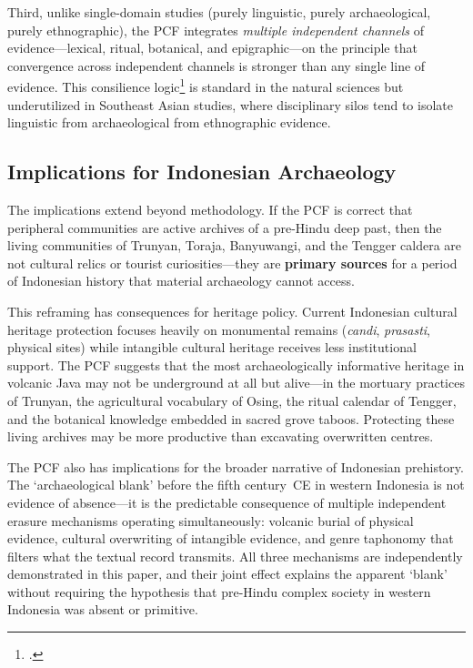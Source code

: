 \documentclass[12pt,a4paper]{article}
\begin{document}
Third, unlike single-domain studies (purely linguistic, purely archaeological, purely ethnographic), the PCF integrates \emph{multiple independent channels} of evidence---lexical, ritual, botanical, and epigraphic---on the principle that convergence across independent channels is stronger than any single line of evidence. This consilience logic\footnote{\autocite{whewell1840philosophy}.} is standard in the natural sciences but underutilized in Southeast Asian studies, where disciplinary silos tend to isolate linguistic from archaeological from ethnographic evidence.

\subsection{Implications for Indonesian Archaeology}

The implications extend beyond methodology. If the PCF is correct that peripheral communities are active archives of a pre-Hindu deep past, then the living communities of Trunyan, Toraja, Banyuwangi, and the Tengger caldera are not cultural relics or tourist curiosities---they are \textbf{primary sources} for a period of Indonesian history that material archaeology cannot access.

This reframing has consequences for heritage policy. Current Indonesian cultural heritage protection focuses heavily on monumental remains (\emph{candi}, \emph{prasasti}, physical sites) while intangible cultural heritage receives less institutional support. The PCF suggests that the most archaeologically informative heritage in volcanic Java may not be underground at all but alive---in the mortuary practices of Trunyan, the agricultural vocabulary of Osing, the ritual calendar of Tengger, and the botanical knowledge embedded in sacred grove taboos. Protecting these living archives may be more productive than excavating overwritten centres.

The PCF also has implications for the broader narrative of Indonesian prehistory. The `archaeological blank' before the fifth century~CE in western Indonesia is not evidence of absence---it is the predictable consequence of multiple independent erasure mechanisms operating simultaneously: volcanic burial of physical evidence, cultural overwriting of intangible evidence, and genre taphonomy that filters what the textual record transmits. All three mechanisms are independently demonstrated in this paper, and their joint effect explains the apparent `blank' without requiring the hypothesis that pre-Hindu complex society in western Indonesia was absent or primitive.
\end{document}
